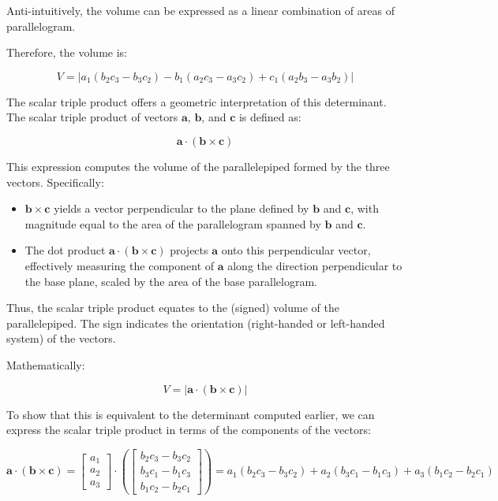 \documentclass[12pt,a4paper]{article}
\begin{document}
\begin{remark}
    Anti-intuitively, the volume can be expressed as a linear combination of areas of parallelogram.
\end{remark}
Therefore, the volume is:

\[
V = \left| a_1 (b_2 c_3 - b_3 c_2) - b_1 (a_2 c_3 - a_3 c_2) + c_1 (a_2 b_3 - a_3 b_2) \right|
\]

The scalar triple product offers a geometric interpretation of this determinant. The scalar triple product of vectors \(\mathbf{a}\), \(\mathbf{b}\), and \(\mathbf{c}\) is defined as:

\[
\mathbf{a} \cdot (\mathbf{b} \times \mathbf{c})
\]

This expression computes the volume of the parallelepiped formed by the three vectors. Specifically:

\begin{itemize}
    \item \(\mathbf{b} \times \mathbf{c}\) yields a vector perpendicular to the plane defined by \(\mathbf{b}\) and \(\mathbf{c}\), with magnitude equal to the area of the parallelogram spanned by \(\mathbf{b}\) and \(\mathbf{c}\).
    \item The dot product \(\mathbf{a} \cdot (\mathbf{b} \times \mathbf{c})\) projects \(\mathbf{a}\) onto this perpendicular vector, effectively measuring the component of \(\mathbf{a}\) along the direction perpendicular to the base plane, scaled by the area of the base parallelogram.
\end{itemize}

Thus, the scalar triple product equates to the (signed) volume of the parallelepiped. The sign indicates the orientation (right-handed or left-handed system) of the vectors.

Mathematically:

\[
V = \left| \mathbf{a} \cdot (\mathbf{b} \times \mathbf{c}) \right|
\]

To show that this is equivalent to the determinant computed earlier, we can express the scalar triple product in terms of the components of the vectors:

\[
\mathbf{a} \cdot (\mathbf{b} \times \mathbf{c}) = \begin{bmatrix} a_1 \\ a_2 \\ a_3 \end{bmatrix} \cdot \left( \begin{bmatrix} b_2 c_3 - b_3 c_2 \\ b_3 c_1 - b_1 c_3 \\ b_1 c_2 - b_2 c_1 \end{bmatrix} \right ) = a_1 (b_2 c_3 - b_3 c_2) + a_2 (b_3 c_1 - b_1 c_3) + a_3 (b_1 c_2 - b_2 c_1)
\]
\end{document}
